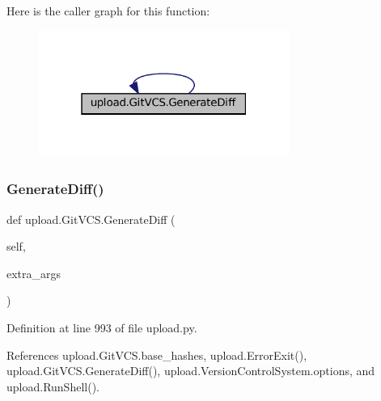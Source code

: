Here is the caller graph for this function\+:
\nopagebreak
\begin{figure}[H]
\begin{center}
\leavevmode
\includegraphics[width=232pt]{classupload_1_1GitVCS_a3ebfc01cebc9b585706ad3f4389a8833_icgraph}
\end{center}
\end{figure}
\mbox{\label{classupload_1_1GitVCS_a3ebfc01cebc9b585706ad3f4389a8833}} 
\subsubsection{\texorpdfstring{Generate\+Diff()}{GenerateDiff()}\hspace{0.1cm}{\footnotesize\ttfamily [2/2]}}
{\footnotesize\ttfamily def upload.\+Git\+V\+C\+S.\+Generate\+Diff (\begin{DoxyParamCaption}\item[{}]{self,  }\item[{}]{extra\+\_\+args }\end{DoxyParamCaption})}



Definition at line 993 of file upload.\+py.



References upload.\+Git\+V\+C\+S.\+base\+\_\+hashes, upload.\+Error\+Exit(), upload.\+Git\+V\+C\+S.\+Generate\+Diff(), upload.\+Version\+Control\+System.\+options, and upload.\+Run\+Shell().


